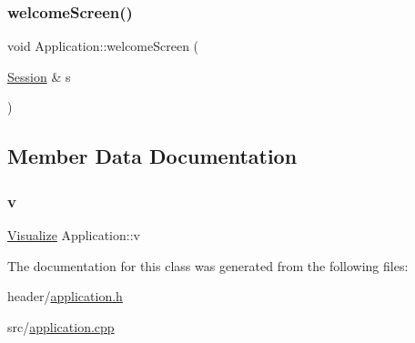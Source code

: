 \subsubsection{\texorpdfstring{welcome\+Screen()}{welcomeScreen()}}
{\footnotesize\ttfamily void Application\+::welcome\+Screen (\begin{DoxyParamCaption}\item[{\hyperlink{struct_session}{Session} \&}]{s }\end{DoxyParamCaption})}



\subsection{Member Data Documentation}
\mbox{\label{class_application_a96cff2295a95d7e6de06638bb7e61243_a96cff2295a95d7e6de06638bb7e61243}} 
\subsubsection{\texorpdfstring{v}{v}}
{\footnotesize\ttfamily \hyperlink{class_visualize}{Visualize} Application\+::v}



The documentation for this class was generated from the following files\+:\begin{DoxyCompactItemize}
\item 
header/\hyperlink{application_8h}{application.\+h}\item 
src/\hyperlink{application_8cpp}{application.\+cpp}\end{DoxyCompactItemize}
